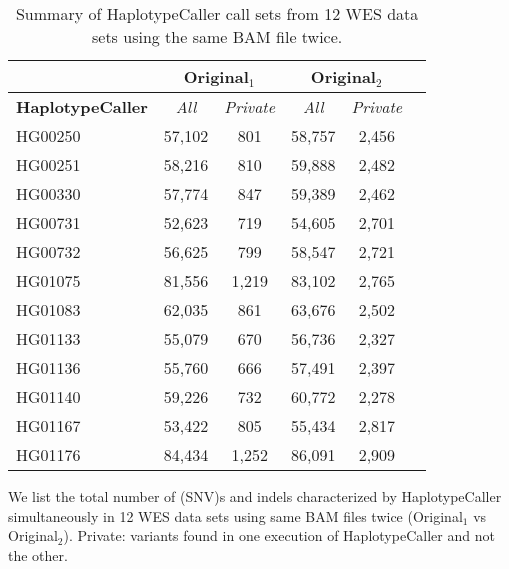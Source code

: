 \begin{table}[htb]
\caption{ Summary of HaplotypeCaller call sets from 12 WES data sets using the same BAM file twice.}
\begin{center}
\begin{tabular}{|l||c|c|c|c|c|}
\hline
{\bf } & \multicolumn{2}{|c|}{Original$_1$} & \multicolumn{2}{|c|}{Original$_2$}\\
\hline
{\bf HaplotypeCaller} & {\it All} & {\it Private} & {\it All} & {\it Private} \\
\hline
HG00250 & 57,102 & 801 & 58,757 & 2,456 \\
HG00251 & 58,216 & 810 & 59,888 & 2,482 \\
HG00330 & 57,774 & 847 & 59,389 & 2,462 \\
HG00731 & 52,623 & 719 & 54,605 & 2,701 \\
HG00732 & 56,625 & 799 & 58,547 & 2,721 \\
HG01075 & 81,556 & 1,219 & 83,102 & 2,765 \\
HG01083 & 62,035 & 861 & 63,676 & 2,502 \\
HG01133 & 55,079 & 670 & 56,736 & 2,327 \\
HG01136 & 55,760 & 666 & 57,491 & 2,397 \\
HG01140 & 59,226 & 732 & 60,772 & 2,278 \\
HG01167 & 53,422 & 805 & 55,434 & 2,817 \\
HG01176 & 84,434 & 1,252 & 86,091 & 2,909 \\
\hline
\end{tabular}
\end{center}
{\footnotesize We list the total number of (SNV)s and indels characterized by HaplotypeCaller simultaneously in 12 WES data sets using same BAM files twice (Original$_1$ vs Original$_2$).
Private: variants found in one execution of HaplotypeCaller and not the other.}
\label{supptab:orig-vs-orig2-multiple-hc}
\end{table}

